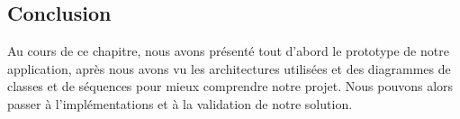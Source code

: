 \newpage
\subsection*{Conclusion}

Au cours de ce chapitre, nous avons présenté tout d'abord le prototype de notre application, après nous avons vu les architectures utilisées et des diagrammes
de classes et de séquences pour mieux comprendre notre projet. Nous pouvons alors passer à l’implémentations et à la validation
de notre solution.

